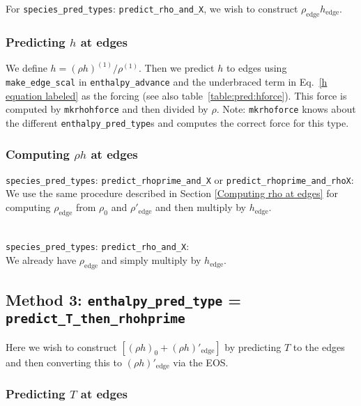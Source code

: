 For {\tt species\_pred\_types}: {\tt predict\_rho\_and\_X}, we wish to
construct $\rho_\mathrm{edge} h_\mathrm{edge}$.

\subsubsection{Predicting $h$ at edges}

We define $h = (\rho h)^{(1)}/\rho^{(1)}$.  Then we predict $h$ to edges
using {\tt make\_edge\_scal} in {\tt enthalpy\_advance} and the
underbraced term in Eq.~\ref{h equation labeled} as the forcing (see
also table~\ref{table:pred:hforce}).  This force is computed by
{\tt mkrhohforce} and then divided by $\rho$.  Note: {\tt mkrhoforce}
knows about the different {\tt enthalpy\_pred\_type}s and computes
the correct force for this type.

\subsubsection{Computing $\rho h$ at edges}

{\tt species\_pred\_types}: {\tt predict\_rhoprime\_and\_X} or
{\tt predict\_rhoprime\_and\_rhoX}:\\[1mm]
%
We use the same procedure described in Section \ref{Computing rho at
  edges} for computing $\rho_\mathrm{edge}$ from $\rho_0$ and
$\rho'_\mathrm{edge}$ and then multiply by $h_\mathrm{edge}$.

\ \\
{\tt species\_pred\_types}: {\tt predict\_rho\_and\_X}:\\[1mm]
%
We already have $\rho_\mathrm{edge}$ and simply multiply by
$h_\mathrm{edge}$.



\subsection{Method 3: {\tt enthalpy\_pred\_type} = {\tt predict\_T\_then\_rhohprime}}

Here we wish to construct $\left [ (\rho h)_0 + (\rho
  h)'_\mathrm{edge} \right ]$ by predicting $T$ to the edges and then
converting this to $(\rho h)'_\mathrm{edge}$ via the EOS.

\subsubsection{Predicting $T$ at edges}

